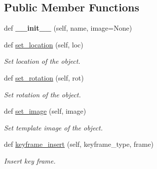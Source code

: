 \subsection*{Public Member Functions}
\begin{DoxyCompactItemize}
\item 
def {\bfseries \+\_\+\+\_\+init\+\_\+\+\_\+} (self, name, image=None)\hypertarget{classobjects_1_1BlenderObject_a53848afaa4520cb9a4829a3195431305}{}\label{classobjects_1_1BlenderObject_a53848afaa4520cb9a4829a3195431305}

\item 
def \hyperlink{classobjects_1_1BlenderObject_a1fba576cf5d5e0da4e6e4bf527910d9a}{set\+\_\+location} (self, loc)
\begin{DoxyCompactList}\small\item\em Set location of the object. \end{DoxyCompactList}\item 
def \hyperlink{classobjects_1_1BlenderObject_a2cb1f87c44cc7679e22ec411d731f9c1}{set\+\_\+rotation} (self, rot)
\begin{DoxyCompactList}\small\item\em Set rotation of the object. \end{DoxyCompactList}\item 
def \hyperlink{classobjects_1_1BlenderObject_a6867acef4c79697a549e7420f1365528}{set\+\_\+image} (self, image)
\begin{DoxyCompactList}\small\item\em Set template image of the object. \end{DoxyCompactList}\item 
def \hyperlink{classobjects_1_1BlenderObject_aa9e2a9a207bd727c7ee942dae6c78454}{keyframe\+\_\+insert} (self, keyframe\+\_\+type, frame)
\begin{DoxyCompactList}\small\item\em Insert key frame. \end{DoxyCompactList}\end{DoxyCompactItemize}
